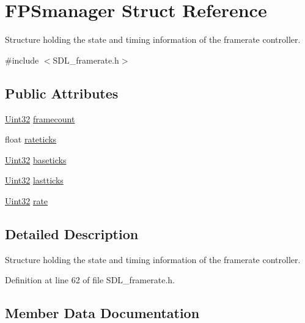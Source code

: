 \hypertarget{struct_f_p_smanager}{}\section{F\+P\+Smanager Struct Reference}
\label{struct_f_p_smanager}


Structure holding the state and timing information of the framerate controller.  




{\ttfamily \#include $<$S\+D\+L\+\_\+framerate.\+h$>$}

\subsection*{Public Attributes}
\begin{DoxyCompactItemize}
\item 
\hyperlink{_s_d_l__stdinc_8h_add440eff171ea5f55cb00c4a9ab8672d}{Uint32} \hyperlink{struct_f_p_smanager_a1524f84f09c0a173ac84d0312e4cdac2}{framecount}
\item 
float \hyperlink{struct_f_p_smanager_a501cd3ffc7112afbbb95b5d9495ef7d3}{rateticks}
\item 
\hyperlink{_s_d_l__stdinc_8h_add440eff171ea5f55cb00c4a9ab8672d}{Uint32} \hyperlink{struct_f_p_smanager_a1081a61aebaf2a5af71ecc9468ad30e0}{baseticks}
\item 
\hyperlink{_s_d_l__stdinc_8h_add440eff171ea5f55cb00c4a9ab8672d}{Uint32} \hyperlink{struct_f_p_smanager_aa1382b38f899de904ec17d38c05090fc}{lastticks}
\item 
\hyperlink{_s_d_l__stdinc_8h_add440eff171ea5f55cb00c4a9ab8672d}{Uint32} \hyperlink{struct_f_p_smanager_ae0a4f3f20f71f7bdfef055f5d0eac187}{rate}
\end{DoxyCompactItemize}


\subsection{Detailed Description}
Structure holding the state and timing information of the framerate controller. 

Definition at line 62 of file S\+D\+L\+\_\+framerate.\+h.



\subsection{Member Data Documentation}
\hypertarget{struct_f_p_smanager_a1081a61aebaf2a5af71ecc9468ad30e0}{}
